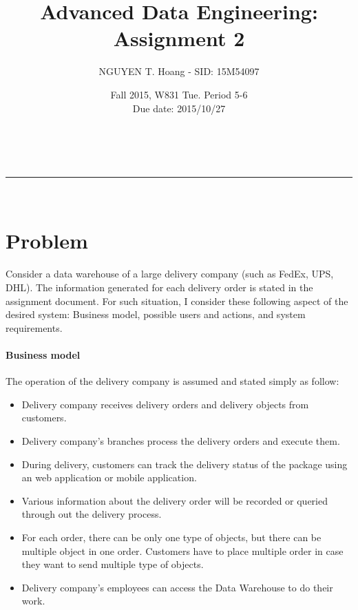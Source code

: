 \documentclass[a4paper,11pt]{article}
\makeatletter
\newcommand{\linia}{\rule{\linewidth}{0.5pt}}
\renewcommand{\maketitle}{
\begin{center}
\vspace{2ex}
{\huge \textsc{\@title}}
\vspace{1ex}
\\
\linia\\
\@author \hfill \@date
\vspace{4ex}
\end{center}
}
\makeatother
\begin{document}
\title{Advanced Data Engineering: Assignment 2}

\author{NGUYEN T. Hoang - SID: 15M54097}

\date{Fall 2015, W831 Tue. Period 5-6 \\ \hfill Due date: 2015/10/27}

\maketitle

\section*{Problem}

Consider a data warehouse of a large delivery company (such as FedEx, UPS, DHL). The information generated for each delivery order is stated in the assignment document. For such situation, I consider these following aspect of the desired system: Business model, possible users and actions, and system requirements.

\paragraph{Business model} The operation of the delivery company is assumed and stated simply as follow:
\begin{itemize}
    \setlength{\itemsep}{0cm}
    \setlength{\parskip}{0cm}
    \item Delivery company receives delivery orders and delivery objects from customers.
    \item Delivery company's branches process the delivery orders and execute them.
    \item During delivery, customers can track the delivery status of the package using an web application or mobile application.
    \item Various information about the delivery order will be recorded or queried through out the delivery process.
    \item For each order, there can be only one type of objects, but there can be multiple object in one order. Customers have to place multiple order in case they want to send multiple type of objects.
    \item Delivery company's employees can access the Data Warehouse to do their work.
\end{itemize}
\end{document}
